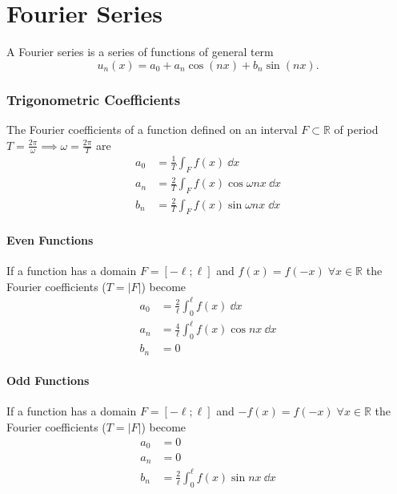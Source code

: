 \part{Fourier Series}
\begin{definition}
	A Fourier series is a series of functions of general term
	\[
		u_n(x)=a_0 + a_n \cos(nx)+b_n\sin(nx)
		.\]
\end{definition}

\section{Trigonometric Coefficients}
The Fourier coefficients of a function defined on an interval $F \subset \mathbb{R}$ of period $T=\frac{2\pi}{\omega}\implies\omega=\frac{2\pi}{T}$ are 
\begin{align*}
    a_0 &= \frac{1}{T}\int_F f(x)\:\dd{x}\\
    a_n&=\frac{2}{T}\int_F f(x) \cos \omega nx \: \dd{x}\\
    b_n&=\frac{2}{T}\int_F f(x) \sin \omega nx\; \dd{x}
\end{align*} 

\subsection{Even Functions}
If a function has a domain $F=[-\ell;\ell]$ and $f(x)=f(-x)\;\forall x\in \mathbb{R}$ the Fourier coefficients ($T=|F|$) become 
\begin{align*}
    a_0&=\frac{2}{\ell}\int_0^\ell f(x)\:\dd{x}\\
    a_n&=\frac{4}{\ell}\int_0^\ell f(x) \cos nx\:\dd{x}\\
    b_n&=0
\end{align*}

\subsection{Odd Functions}
If a function has a domain $F=[-\ell;\ell]$ and $-f(x)=f(-x)\;\forall x\in \mathbb{R}$ the Fourier coefficients ($T=|F|$) become 
\begin{align*}
    a_0&=0\\
    a_n&=0\\
    b_n&=\frac{2}{\ell}\int_0^\ell f(x) \sin nx \: \dd {x}
\end{align*}


